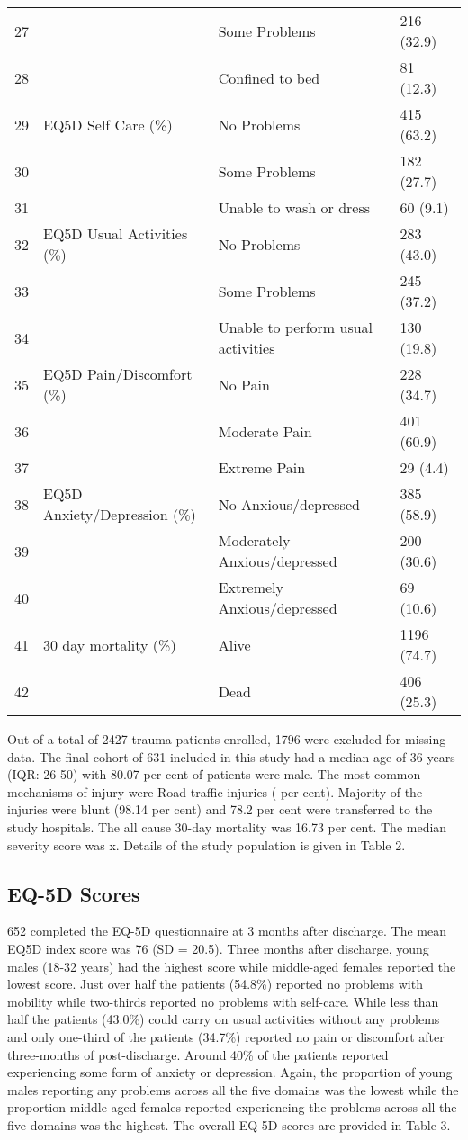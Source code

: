 \documentclass[
]{article}
\begin{document}
\begin{longtable}[]{@{}llll@{}}
27 & & Some Problems & 216 (32.9) \\
28 & & Confined to bed & 81 (12.3) \\
29 & EQ5D Self Care (\%) & No Problems & 415 (63.2) \\
30 & & Some Problems & 182 (27.7) \\
31 & & Unable to wash or dress & 60 (9.1) \\
32 & EQ5D Usual Activities (\%) & No Problems & 283 (43.0) \\
33 & & Some Problems & 245 (37.2) \\
34 & & Unable to perform usual activities & 130 (19.8) \\
35 & EQ5D Pain/Discomfort (\%) & No Pain & 228 (34.7) \\
36 & & Moderate Pain & 401 (60.9) \\
37 & & Extreme Pain & 29 (4.4) \\
38 & EQ5D Anxiety/Depression (\%) & No Anxious/depressed & 385 (58.9) \\
39 & & Moderately Anxious/depressed & 200 (30.6) \\
40 & & Extremely Anxious/depressed & 69 (10.6) \\
41 & 30 day mortality (\%) & Alive & 1196 (74.7) \\
42 & & Dead & 406 (25.3) \\
\bottomrule
\end{longtable}

Out of a total of 2427 trauma patients enrolled, 1796 were excluded for
missing data. The final cohort of 631 included in this study had a
median age of 36 years (IQR: 26-50) with 80.07 per cent of patients were
male. The most common mechanisms of injury were Road traffic injuries (
per cent). Majority of the injuries were blunt (98.14 per cent) and 78.2
per cent were transferred to the study hospitals. The all cause 30-day
mortality was 16.73 per cent. The median severity score was x. Details
of the study population is given in Table 2.

\hypertarget{eq-5d-scores}{%
\subsection{EQ-5D Scores}\label{eq-5d-scores}}

652 completed the EQ-5D questionnaire at 3 months after discharge. The
mean EQ5D index score was 76 (SD = 20.5). Three months after discharge,
young males (18-32 years) had the highest score while middle-aged
females reported the lowest score. Just over half the patients (54.8\%)
reported no problems with mobility while two-thirds reported no problems
with self-care. While less than half the patients (43.0\%) could carry
on usual activities without any problems and only one-third of the
patients (34.7\%) reported no pain or discomfort after three-months of
post-discharge. Around 40\% of the patients reported experiencing some
form of anxiety or depression. Again, the proportion of young males
reporting any problems across all the five domains was the lowest while
the proportion middle-aged females reported experiencing the problems
across all the five domains was the highest. The overall EQ-5D scores
are provided in Table 3.
\end{document}

